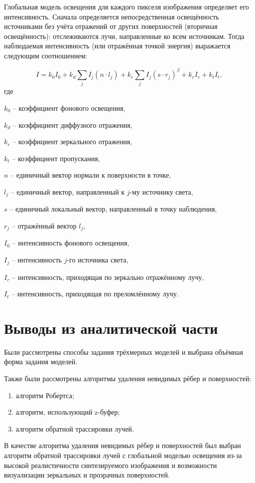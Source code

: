 Глобальная модель освещения для каждого пикселя изображения определяет его интенсивность. Сначала определяется непосредственная освещённость источниками без учёта отражений от других поверхностей (вторичная освещённость): отслеживаются лучи, направленные ко всем источникам. Тогда наблюдаемая интенсивность (или отражённая точкой энергия) выражается следующим соотношением:

\begin{equation}
	I = k_0I_0 + k_d\sum\limits_{j}^{}I_j(n \cdot l_j) + k_r\sum\limits_{j}^{}I_j(s \cdot r_j)^{\beta}+k_rI_r+k_tI_t,
\end{equation}
где

$k_0$ -- коэффициент фонового освещения,

$k_d$ -- коэффициент диффузного отражения,

$k_r$ -- коэффициент зеркального отражения,

$k_t$ -- коэффициент пропускания,

$n$ -- единичный вектор нормали к поверхности в точке,

$l_j$ -- единичный вектор, направленный к $j$-му источнику света,

$s$ -- единичный локальный вектор, направленный в точку наблюдения,

$r_j$ -- отражённый вектор $l_j$,

$I_0$ -- интенсивность фонового освещения,

$I_j$ -- интенсивность $j$-го источника света,

$I_r$ --  интенсивность, приходящая по зеркально отражённому лучу,

$I_t$ -- интенсивность, приходящая по преломлённому лучу.

\section{Выводы из аналитической части}
Были рассмотрены способы задания трёхмерных моделей и выбрана объёмная форма задания моделей.

Также были рассмотрены алгоритмы удаления невидимых рёбер и поверхностей:
\begin{enumerate}[label=\arabic*)]
	\item алгоритм Робертса;
	\item алгоритм, использующий z-буфер;
	\item алгоритм обратной трассировки лучей.
\end{enumerate}
В качестве  алгоритма удаления невидимых рёбер и поверхностей был выбран алгоритм обратной трассировки лучей с глобальной моделью освещения из-за высокой реалистичности синтезируемого изображения и возможности визуализации зеркальных и прозрачных поверхностей.
 
